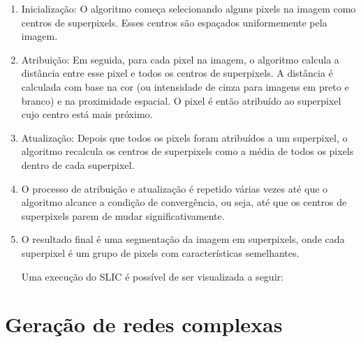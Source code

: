 \begin{enumerate}

\item Inicialização: O algoritmo começa selecionando alguns pixels na
imagem como centros de superpixels. Esses centros são espaçados
uniformemente pela imagem.

\item Atribuição: Em seguida, para cada pixel na imagem, o algoritmo
calcula a distância entre esse pixel e todos os centros de
superpixels. A distância é calculada com base na cor (ou intensidade
de cinza para imagens em preto e branco) e na proximidade espacial. O
pixel é então atribuído ao superpixel cujo centro está mais próximo.

\item Atualização: Depois que todos os pixels foram atribuídos a um
superpixel, o algoritmo recalcula os centros de superpixels como a
média de todos os pixels dentro de cada superpixel.

\item O processo de atribuição e atualização é repetido várias vezes
até que o algoritmo alcance a condição de convergência, ou seja, até
que os centros de superpixels parem de mudar significativamente.

\item O resultado final é uma segmentação da imagem em superpixels, onde
cada superpixel é um grupo de pixels com características semelhantes.

Uma execução do SLIC é possível de ser visualizada a seguir:

\begin{figure}[h!]
        \captionsetup{width=12cm}
		\centering
\end{figure}


\end{enumerate}

\section{Geração de redes complexas}\label{sec:teorica-redes-complexas}

